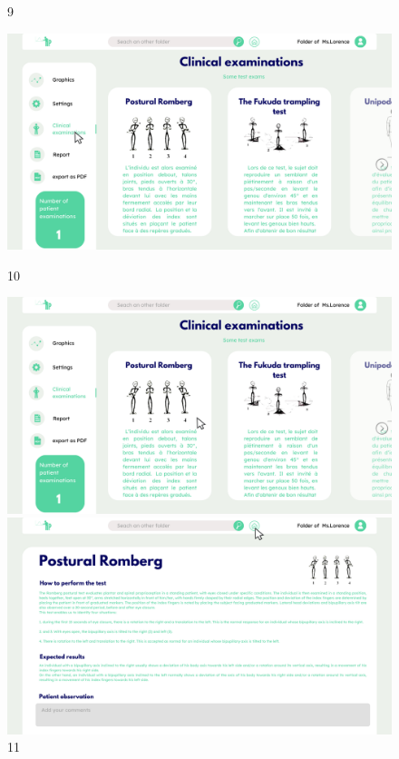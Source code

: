 \begin{figure}[H]
\begin{minipage}{0.3\textwidth}
        \caption*{9}
    \end{minipage}
    \begin{minipage}{0.3\textwidth}
        \centering
        \includegraphics[width=\textwidth]{images/Prototype/10.png}
        \caption*{10}
    \end{minipage}
    \begin{minipage}{0.3\textwidth}
        \centering
        \includegraphics[width=\textwidth]{images/Prototype/11.png}
        \caption*{11}
    \end{minipage}
    \begin{minipage}{0.3\textwidth}
        \centering
        \includegraphics[width=\textwidth]{images/Prototype/12.png}

\end{minipage}
\end{figure}
